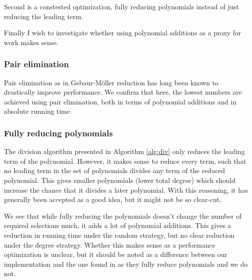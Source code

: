 \documentclass{article}
\theoremstyle{changedot}
\theoremstyle{changedotbreak}
\theoremstyle{nonumberplain}
\begin{document}
Second is a constested optimization, fully reducing polynomials instead of just reducing the leading term.

Finally I wish to investigate whether using polynomial additions as a proxy for work makes sense.

\subsubsection{Pair elimination}
Pair elimination as in Gebaur-Möller reduction has long been known to drastically improve performance. We confirm that here, the lowest numbers are achieved using pair elimination, both in terms of polynomial additions and in absolute running time.



\subsubsection{Fully reducing polynomials}
The division algorithm presented in Algorithm \ref{alg:div} only reduces the leading term of the polynomial. However, it makes sense to reduce every term, such that no leading term in the set of polynomials divides any term of the reduced polynomial. This gives smaller polynomials (lower total degree) which should increase the chance that it divides a later polynomial. With this reasoning, it has generally been accepted as a good idea, but it might not be so clear-cut.

We see that while fully reducing the polynomials doesn't change the number of required selections much, it adds a lot of polynomial additions. This gives a reduction in running time under the random strategy, but no clear reduction under the degree strategy. Whether this makes sense as a performance optimization is unclear, but it should be noted as a difference between our implementation and the one found in \cite{peifer} as they fully reduce polynomials and we do not.

\end{document}
